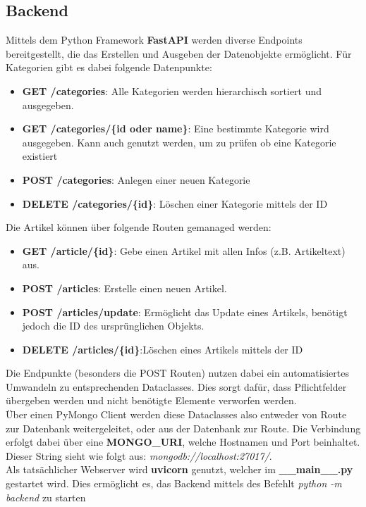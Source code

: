 \subsection{Backend}
Mittels dem Python Framework \textbf{FastAPI} werden diverse Endpoints bereitgestellt, die das Erstellen und Ausgeben der Datenobjekte ermöglicht.
Für Kategorien gibt es dabei folgende Datenpunkte:
\begin{itemize}
\item \textbf{GET /categories}: Alle Kategorien werden hierarchisch sortiert und ausgegeben.
\item \textbf{GET /categories/\{id oder name\}}: Eine bestimmte Kategorie wird ausgegeben. Kann auch genutzt werden, um zu prüfen ob eine Kategorie existiert 
\item \textbf{POST /categories}: Anlegen einer neuen Kategorie
\item \textbf{DELETE /categories/\{id\}}: Löschen einer Kategorie mittels der ID
\end{itemize}


Die Artikel können über folgende Routen gemanaged werden:
\begin{itemize}
\item \textbf{GET /article/\{id\}}: Gebe einen Artikel mit allen Infos (z.B. Artikeltext) aus.
\item \textbf{POST /articles}: Erstelle einen neuen Artikel.
\item \textbf{POST /articles/update}: Ermöglicht das Update eines Artikels, benötigt jedoch die ID des ursprünglichen Objekts.
\item \textbf{DELETE /articles/\{id\}}:Löschen eines Artikels mittels der ID
\end{itemize}

Die Endpunkte (besonders die POST Routen) nutzen dabei ein automatisiertes Umwandeln zu entsprechenden Dataclasses.
Dies sorgt dafür, dass Pflichtfelder übergeben werden und nicht benötigte Elemente verworfen werden.\\
Über einen PyMongo Client werden diese Dataclasses also entweder von Route zur Datenbank weitergeleitet, oder aus der Datenbank zur Route.
Die Verbindung erfolgt dabei über eine \textbf{MONGO\_URI}, welche Hostnamen und Port beinhaltet. Dieser String sieht wie folgt aus: \textit{mongodb://localhost:27017/}. \\
Als tatsächlicher Webserver wird \textbf{uvicorn} genutzt, welcher im \textbf{\_\_main\_\_.py} gestartet wird. Dies ermöglicht es, das Backend mittels des Befehlt \textit{python -m backend} zu starten

